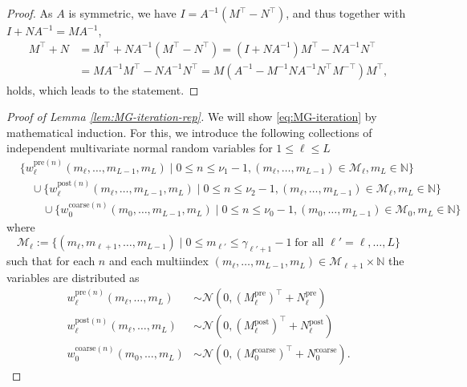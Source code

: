 \documentclass[11pt,english]{article}
\theoremstyle{plain}
\theoremstyle{plain}
\theoremstyle{plain}
\theoremstyle{plain}
\numberwithin{equation}{section}
\newcommand*{\id}{I}
\begin{document}
\begin{proof}
	As $A$ is symmetric, we have $\id=A^{-1}(M^{\top}-N^{\top})$,
	and thus together with $\id+NA^{-1}=MA^{-1}$,
	\begin{align*}
		M^{\top}+N & =M^{\top}+NA^{-1}(M^{\top}-N^{\top})=(\id+NA^{-1})M^{\top}-NA^{-1}N^{\top} \\
		           & =MA^{-1}M^{\top}-NA^{-1}N^{\top}       =M(A^{-1}-M^{-1}NA^{-1}N^{\top}M^{-\top})M^{\top},
	\end{align*}
	holds, which leads to the statement.
\end{proof}
\begin{proof}[Proof of Lemma \ref{lem:MG-iteration-rep}]
	We will show \eqref{eq:MG-iteration} by mathematical induction. For this, we introduce the following collections of independent multivariate normal random variables for $1\le\ell\le L$
	\begin{equation}
		\begin{aligned}
			 & \{w_{\ell}^{\mathrm{pre}(n)}(m_{\ell},\dots,m_{L-1},m_{L})\mid0\leq n\leq\nu_{1}-1,(m_{\ell},\dots,m_{L-1})\in\mathscr{M}_{\ell}, m_{L}\in \mathbb{N}\}             \\
			 & \quad{\cup}\{w_{\ell}^{\mathrm{post}(n)}(m_{\ell},\dots,m_{L-1},m_{L})\mid0\leq n\leq\nu_{2}-1,(m_{\ell},\dots,m_{L-1})\in\mathscr{M}_{\ell}, m_{L}\in \mathbb{N}\} \\
			 & \qquad{\cup}\{w_{0}^{\mathrm{coarse}(n)}(m_0,\dots,m_{L-1},m_L)\mid0\leq n\leq\nu_{0}-1,(m_0,\dots,m_{L-1})\in\mathscr{M}_0, m_{L}\in \mathbb{N}\}
		\end{aligned}
		\label{eqn:w_samples}
	\end{equation}
	where
	\begin{equation}
		\mathscr{M}_\ell := \{ (m_{\ell},m_{\ell+1},\dots,m_{L-1})\mid 0\leq m_{\ell'}\leq\gamma_{\ell'+1}-1\;\text{for all $\ell'=\ell,\dots,L$}\}
	\end{equation}
	such that for each $n$ and each multiindex $(m_{\ell},\dots,m_{L-1},m_L)\in\mathcal{M}_{\ell+1}\times \mathbb{N}$ the variables are distributed as
	\begin{equation}
		\begin{aligned}
			w_{\ell}^{\mathrm{pre}(n)}(m_{\ell},\dots,m_{L})  & \sim\mathcal{N}(0,(M^{\mathrm{pre}}_{\ell})^{\top}+N^{\mathrm{pre}}_{\ell})   \\
			w_{\ell}^{\mathrm{post}(n)}(m_{\ell},\dots,m_{L}) & \sim\mathcal{N}(0,(M^{\mathrm{post}}_{\ell})^{\top}+N^{\mathrm{post}}_{\ell}) \\
			w_{0}^{\mathrm{coarse}(n)}(m_0,\dots,m_{L})       & \sim\mathcal{N}(0,(M^{\mathrm{coarse}}_{0})^{\top}+N^{\mathrm{coarse}}_{0}).

\end{aligned}
\end{equation}
\end{proof}
\end{document}
